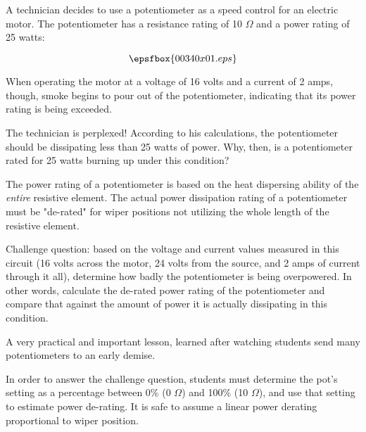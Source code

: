 

A technician decides to use a potentiometer as a speed control for an electric motor.  The potentiometer has a resistance rating of 10 $\Omega$ and a power rating of 25 watts:

$$\epsfbox{00340x01.eps}$$

When operating the motor at a voltage of 16 volts and a current of 2 amps, though, smoke begins to pour out of the potentiometer, indicating that its power rating is being exceeded.

The technician is perplexed!  According to his calculations, the potentiometer should be dissipating less than 25 watts of power.  Why, then, is a potentiometer rated for 25 watts burning up under this condition?







The power rating of a potentiometer is based on the heat dispersing ability of the {\it entire} resistive element.  The actual power dissipation rating of a potentiometer must be "de-rated" for wiper positions not utilizing the whole length of the resistive element.

\vskip 10pt

Challenge question: based on the voltage and current values measured in this circuit (16 volts across the motor, 24 volts from the source, and 2 amps of current through it all), determine how badly the potentiometer is being overpowered.  In other words, calculate the de-rated power rating of the potentiometer and compare that against the amount of power it is actually dissipating in this condition.







A very practical and important lesson, learned after watching students send many potentiometers to an early demise.

In order to answer the challenge question, students must determine the pot's setting as a percentage between 0\% (0 $\Omega$) and 100\% (10 $\Omega$), and use that setting to estimate power de-rating.  It is safe to assume a linear power derating proportional to wiper position.




